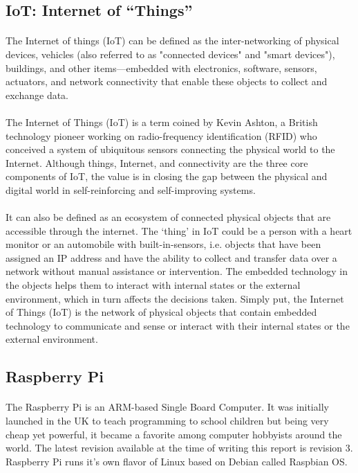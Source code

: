 \subsection{IoT: Internet of ``Things''}
\paragraph{}
The Internet of things (IoT) can be defined as the inter-networking of physical devices, vehicles (also referred to as "connected devices" and "smart devices"), buildings, and other items—embedded with electronics, software, sensors, actuators, and network connectivity that enable these objects to collect and exchange data.
\paragraph{}
The Internet of Things (IoT) is a term coined by Kevin Ashton, a British technology pioneer working on radio-frequency identification (RFID) who conceived a system of ubiquitous sensors connecting the physical world to the Internet. Although things, Internet, and connectivity are the three core components of IoT, the value is in closing the gap between the physical and digital world in self-reinforcing and self-improving systems.
\paragraph{}
It can also be defined as an ecosystem of connected physical objects that are accessible through the internet. The ‘thing’ in IoT could be a person with a heart monitor or an automobile with built-in-sensors, i.e. objects that have been assigned an IP address and have the ability to collect and transfer data over a network without manual assistance or intervention. The embedded technology in the objects helps them to interact with internal states or the external environment, which in turn affects the decisions taken. Simply put, the Internet of Things (IoT) is the network of physical objects that contain embedded technology to communicate and sense or interact with their internal states or the external environment.

\subsection{Raspberry Pi}
\paragraph{}
The Raspberry Pi is an ARM-based Single Board Computer. It was initially launched in the UK to teach programming to school children but being very cheap yet powerful, it became a favorite among computer hobbyists around the world. The latest revision available at the time of writing this report is revision 3. Raspberry Pi runs it's own flavor of Linux based on Debian called Raspbian OS.
